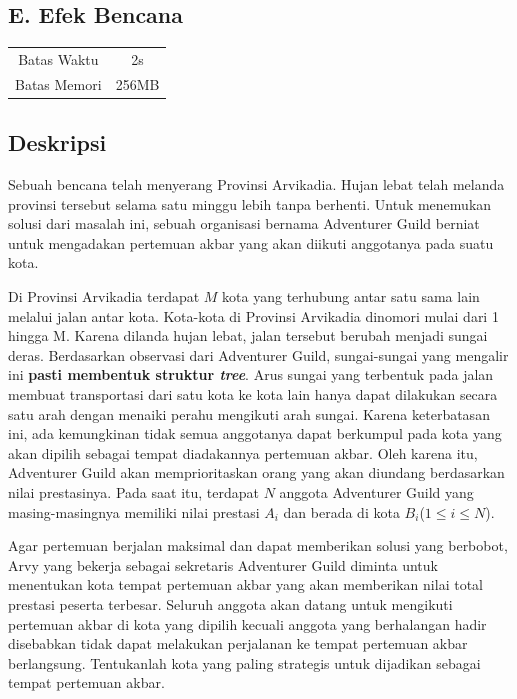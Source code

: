 \documentclass{article}
\begin{document}
\begin{center}
    \section*{E. Efek Bencana} %

    \begin{tabular}{ | c c | }
        \hline
        Batas Waktu  & 2s \\    %
        Batas Memori & 256MB \\  %
        \hline
    \end{tabular}
\end{center}

\subsection*{Deskripsi}
Sebuah bencana telah menyerang Provinsi Arvikadia. Hujan lebat telah melanda provinsi tersebut selama satu minggu lebih tanpa berhenti. Untuk menemukan solusi dari masalah ini, sebuah organisasi bernama Adventurer Guild berniat untuk mengadakan pertemuan akbar yang akan diikuti anggotanya pada suatu kota.

Di Provinsi Arvikadia terdapat $M$ kota yang terhubung antar satu sama lain melalui jalan antar kota. Kota-kota di Provinsi Arvikadia dinomori mulai dari 1 hingga M.
Karena dilanda hujan lebat, jalan tersebut berubah menjadi sungai deras. Berdasarkan observasi dari Adventurer Guild, sungai-sungai yang mengalir ini {\bf pasti membentuk struktur \textit{tree}}. Arus sungai yang terbentuk pada jalan membuat transportasi dari satu kota ke kota lain hanya dapat dilakukan secara satu arah dengan menaiki perahu mengikuti arah sungai.
Karena keterbatasan ini, ada kemungkinan tidak semua anggotanya dapat berkumpul pada kota yang akan dipilih sebagai tempat diadakannya pertemuan akbar. Oleh karena itu, Adventurer Guild akan memprioritaskan orang yang akan diundang berdasarkan nilai prestasinya. Pada saat itu, terdapat $N$ anggota Adventurer Guild yang masing-masingnya memiliki nilai prestasi $A_i$ dan berada di kota $B_i$($1 \leq i \leq N$). 

Agar pertemuan berjalan maksimal dan dapat memberikan solusi yang berbobot, Arvy yang bekerja sebagai sekretaris Adventurer Guild diminta untuk menentukan kota tempat pertemuan akbar yang akan memberikan nilai total prestasi peserta terbesar. Seluruh anggota akan datang untuk mengikuti pertemuan akbar di kota yang dipilih kecuali anggota yang berhalangan hadir disebabkan tidak dapat melakukan perjalanan ke tempat pertemuan akbar berlangsung. Tentukanlah kota yang paling strategis untuk dijadikan sebagai tempat pertemuan akbar.
\end{document}
